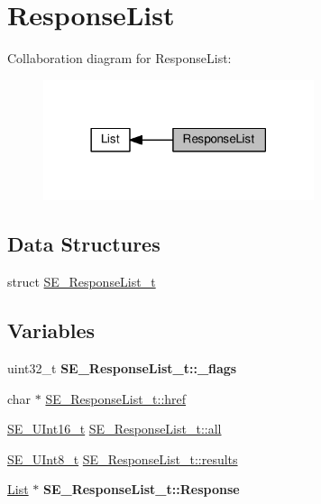 \hypertarget{group__ResponseList}{}\section{Response\+List}
\label{group__ResponseList}
Collaboration diagram for Response\+List\+:\nopagebreak
\begin{figure}[H]
\begin{center}
\leavevmode
\includegraphics[width=225pt]{group__ResponseList}
\end{center}
\end{figure}
\subsection*{Data Structures}
\begin{DoxyCompactItemize}
\item 
struct \hyperlink{structSE__ResponseList__t}{S\+E\+\_\+\+Response\+List\+\_\+t}
\end{DoxyCompactItemize}
\subsection*{Variables}
\begin{DoxyCompactItemize}
\item 
\mbox{\label{group__ResponseList_ga83729fe3b9ca45bd2613ac47bd384865}} 
uint32\+\_\+t {\bfseries S\+E\+\_\+\+Response\+List\+\_\+t\+::\+\_\+flags}
\item 
char $\ast$ \hyperlink{group__ResponseList_ga32523c09761d4f0cd43b3dae1bb3c9d9}{S\+E\+\_\+\+Response\+List\+\_\+t\+::href}
\item 
\hyperlink{group__UInt16_gac68d541f189538bfd30cfaa712d20d29}{S\+E\+\_\+\+U\+Int16\+\_\+t} \hyperlink{group__ResponseList_ga7055f5d4b853f35d0ea603f85154c53c}{S\+E\+\_\+\+Response\+List\+\_\+t\+::all}
\item 
\hyperlink{group__UInt8_gaf7c365a1acfe204e3a67c16ed44572f5}{S\+E\+\_\+\+U\+Int8\+\_\+t} \hyperlink{group__ResponseList_ga45065ab96f53805ad13f19fa4593f52f}{S\+E\+\_\+\+Response\+List\+\_\+t\+::results}
\item 
\mbox{\label{group__ResponseList_ga6ca59fb2a4fa200148c961ab15ea5639}} 
\hyperlink{structList}{List} $\ast$ {\bfseries S\+E\+\_\+\+Response\+List\+\_\+t\+::\+Response}
\end{DoxyCompactItemize}


